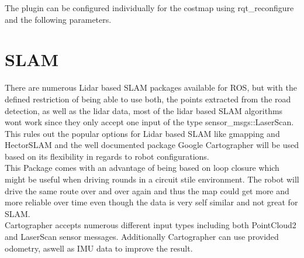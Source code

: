 The plugin can be configured individually for the costmap using rqt\_reconfigure and the following parameters.

\begin{table}[H]
\centering
{}
\label{dynlayerparams}
\caption{dynamic\_cost\_layer parameters}
\end{table}



\section{SLAM}
There are numerous Lidar based SLAM packages available for ROS, but with the defined restriction of being able to use both, the points extracted from the road detection, as well as the lidar data, most of the lidar based SLAM algorithms wont work since they only accept one input of  the type sensor\_msgs::LaserScan.\\
This rules out the popular options for Lidar based SLAM like gmapping and HectorSLAM and the well documented package Google Cartographer will be used based on its flexibility in regards to robot configurations.\\
This Package comes with an advantage of being based on loop closure which might be useful when driving rounds in a circuit stile environment. The robot will drive the same route over and over again and thus the map could get more and more reliable over time even though the data is very self similar and not great for SLAM.\\

Cartographer accepts numerous different input types including both PointCloud2 and LaserScan sensor messages. Additionally Cartographer can use provided odometry, aswell as IMU data to improve the result.\\








